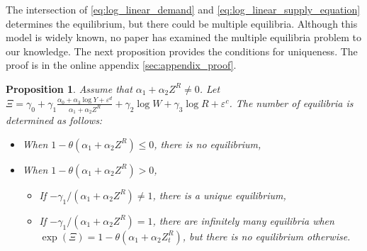 \documentclass[11pt, a4paper]{article}
\newtheorem{proposition}{Proposition}
\theoremstyle{remark}
\begin{document}

The intersection of \eqref{eq:log_linear_demand} and \eqref{eq:log_linear_supply_equation} determines the equilibrium, but there could be multiple equilibria.
Although this model is widely known, no paper has examined the multiple equilibria problem to our knowledge.
The next proposition provides the conditions for uniqueness.
The proof is in the online appendix \ref{sec:appendix_proof}.
\begin{proposition}\label{prop:equilibrium_existence}
    Assume that $\alpha_1 + \alpha_2 Z^{R}\ne 0$. Let $\Xi = \gamma_0 + \gamma_1\frac{\alpha_0 + \alpha_3 \log Y + \varepsilon^{d}}{\alpha_1 + \alpha_2 Z^{R}} +  \gamma_2 \log W + \gamma_3 \log R + \varepsilon^{c}$.
    The number of equilibria is determined as follows:
    \begin{itemize}
        \item When $1 - \theta (\alpha_1 + \alpha_2 Z^{R}) \le 0$, there is no equilibrium,
        \item When $1 - \theta (\alpha_1 + \alpha_2 Z^{R}) >0$, 
        \begin{itemize}
            \item If $-\gamma_1/(\alpha_1+\alpha_2 Z^R) \ne 1$, there is a unique equilibrium,
            \item If $-\gamma_1/(\alpha_1+\alpha_2 Z^R) =1$, there are infinitely many equilibria when $\exp(\Xi) = 1 - \theta (\alpha_1 + \alpha_2 Z^{R}_{t})$, but there is no equilibrium otherwise.
        \end{itemize}
    \end{itemize}
\end{proposition}
\end{document}
